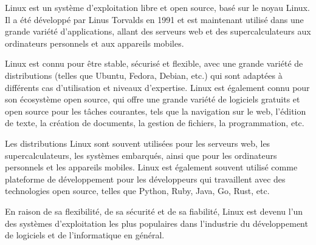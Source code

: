 Linux est un système d'exploitation libre et open source, basé sur le noyau Linux. Il a été développé par Linus Torvalds en 1991 et est maintenant utilisé dans une grande variété d'applications, allant des serveurs web et des supercalculateurs aux ordinateurs personnels et aux appareils mobiles.

Linux est connu pour être stable, sécurisé et flexible, avec une grande variété de distributions (telles que Ubuntu, Fedora, Debian, etc.) qui sont adaptées à différents cas d'utilisation et niveaux d'expertise. Linux est également connu pour son écosystème open source, qui offre une grande variété de logiciels gratuits et open source pour les tâches courantes, tels que la navigation sur le web, l'édition de texte, la création de documents, la gestion de fichiers, la programmation, etc.

Les distributions Linux sont souvent utilisées pour les serveurs web, les supercalculateurs, les systèmes embarqués, ainsi que pour les ordinateurs personnels et les appareils mobiles. Linux est également souvent utilisé comme plateforme de développement pour les développeurs qui travaillent avec des technologies open source, telles que Python, Ruby, Java, Go, Rust, etc.

En raison de sa flexibilité, de sa sécurité et de sa fiabilité, Linux est devenu l'un des systèmes d'exploitation les plus populaires dans l'industrie du développement de logiciels et de l'informatique en général.
